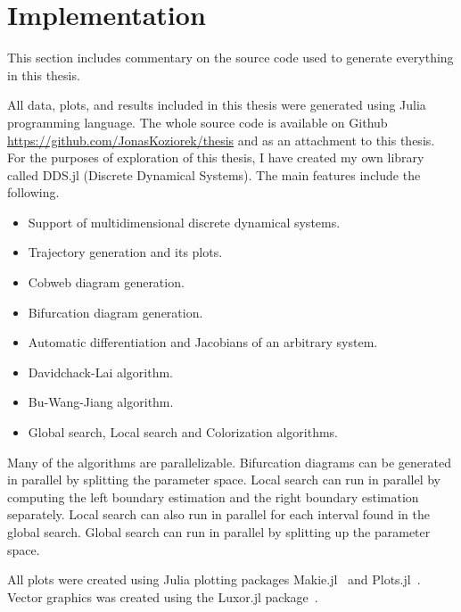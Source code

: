 \section{Implementation}
This section includes commentary on the source code used to generate everything in this thesis.
\par
All data, plots, and results included in this thesis were generated using Julia programming language.
The whole source code is available on Github \url{https://github.com/JonasKoziorek/thesis} and as an attachment to this thesis.
For the purposes of exploration of this thesis, I have created my own library called DDS.jl (Discrete Dynamical Systems).
The main features include the following.
\begin{itemize}
    \item Support of multidimensional discrete dynamical systems.
    \item Trajectory generation and its plots.
    \item Cobweb diagram generation.
    \item Bifurcation diagram generation.
    \item Automatic differentiation and Jacobians of an arbitrary system.
    \item Davidchack-Lai algorithm.
    \item Bu-Wang-Jiang algorithm.
    \item Global search, Local search and Colorization algorithms.
\end{itemize}
Many of the algorithms are parallelizable.
Bifurcation diagrams can be generated in parallel by splitting the parameter space.
Local search can run in parallel by computing the left boundary estimation and the right boundary estimation separately.
Local search can also run in parallel for each interval found in the global search.
Global search can run in parallel by splitting up the parameter space.
\par
All plots were created using Julia plotting packages Makie.jl~\cite{Danisch2021} and Plots.jl~\cite{Christ2022}.
Vector graphics was created using the Luxor.jl package~\cite{Luxor2024}.

\endinput
